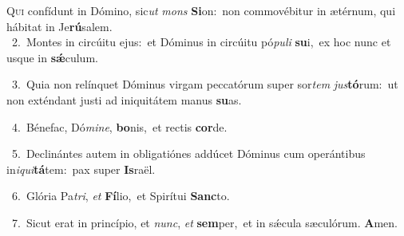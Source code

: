 \lettrine{\initial\textcolor{\initialcolor}{Q}}{ui} confídunt in Dómino, sic\textit{ut} \textit{mons} \textbf{Si}\-on:~\star non commovébitur in ætérnum, qui hábitat in Je\-\textbf{rú}\-salem.\\
{\numbfont\textcolor{\numbcolor}{~2.}}~Montes in circúitu ejus:~\dagger et Dóminus in circúitu pó\-\textit{pu}\-\textit{li} \textbf{su}\-i,~\star ex hoc nunc et usque in \textbf{sǽ}\-culum.\par
{\numbfont\textcolor{\numbcolor}{~3.}}~Quia non relínquet Dóminus virgam peccatórum super sor\textit{tem} \textit{jus}\-\textbf{tó}rum:~\star ut non exténdant justi ad iniquitátem manus \textbf{su}\-as.\par
{\numbfont\textcolor{\numbcolor}{~4.}}~Bénefac, Dó\-\textit{mi}\-\textit{ne}, \textbf{bo}\-nis,~\star et rectis \textbf{cor}\-de.\par
{\numbfont\textcolor{\numbcolor}{~5.}}~Declinántes autem in obligatiónes addúcet Dóminus cum operántibus in\-\textit{i}\-\textit{qui}\textbf{tá}tem:~\star pax super \textbf{Is}\-raël.\par
{\numbfont\textcolor{\numbcolor}{~6.}}~Glória Pa\-\textit{tri}\-, \textit{et} \textbf{Fí}\-lio,~\star et Spirítui \textbf{Sanc}\-to.\par
{\numbfont\textcolor{\numbcolor}{~7.}}~Sicut erat in princípio, et \textit{nunc}\-, \textit{et} \textbf{sem}\-per,~\star et in sǽcula sæculórum. \textbf{A}\-men.\par
